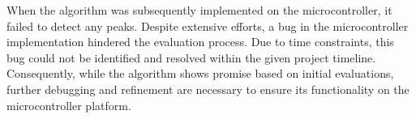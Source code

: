 
When the algorithm was subsequently implemented on the microcontroller, it failed to detect any peaks. Despite extensive efforts, a bug in the microcontroller implementation hindered the evaluation process. Due to time constraints, this bug could not be identified and resolved within the given project timeline. Consequently, while the algorithm shows promise based on initial evaluations, further debugging and refinement are necessary to ensure its functionality on the microcontroller platform.
